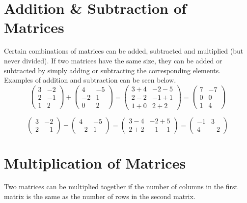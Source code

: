 \section*{Addition \& Subtraction of Matrices}
Certain combinations of matrices can be added, subtracted and multiplied (but never divided). If two matrices have the same size, they can be added or subtracted by simply adding or subtracting the corresponding elements. Examples of addition and subtraction can be seen below.
\begin{equation*}
\begin{pmatrix}
    3 & -2\\
    2 & -1\\
    1 & 2
\end{pmatrix}
+
\begin{pmatrix}
    4 & -5\\
    -2 & 1\\
    0 & 2
\end{pmatrix}
=
\begin{pmatrix}
    3+4 & -2-5\\
    2-2 & -1+1\\
    1+0 & 2+2
\end{pmatrix}
=
\begin{pmatrix}
    7 & -7\\
    0 & 0\\
    1 & 4
\end{pmatrix}
\end{equation*}

\begin{equation*}
\begin{pmatrix}
    3 & -2\\
    2 & -1
\end{pmatrix}
-
\begin{pmatrix}
    4 & -5\\
    -2 & 1
\end{pmatrix}
=
\begin{pmatrix}
    3-4 & -2+5\\
    2+2 & -1-1
\end{pmatrix}
= 
\begin{pmatrix}
    -1 & 3\\
    4 & -2
\end{pmatrix}
\end{equation*}

\section*{Multiplication of Matrices}
Two matrices can be multiplied together if the number of columns in the first matrix is the same as the number of rows in the second matrix. 

